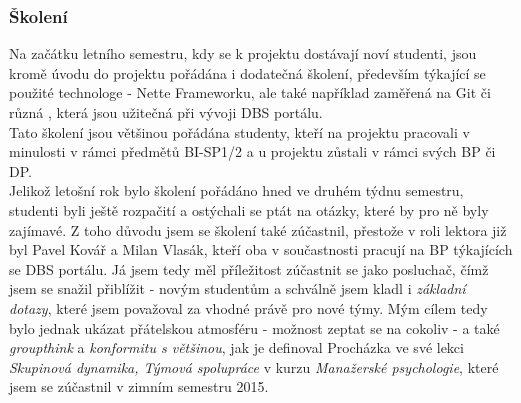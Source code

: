 \subsubsection{Školení}
Na začátku letního semestru, kdy se k projektu dostávají noví studenti, jsou kromě úvodu do projektu pořádána i dodatečná školení, především týkající se použité technologe - Nette Frameworku, ale také například zaměřená na Git či různá , která jsou užitečná při vývoji DBS portálu.\\
Tato školení jsou většinou pořádána studenty, kteří na projektu pracovali v minulosti v rámci předmětů BI-SP1/2 a u projektu zůstali v rámci svých BP či DP.\\
Jelikož letošní rok bylo školení pořádáno hned ve druhém týdnu semestru, studenti byli ještě rozpačití a ostýchali se ptát na otázky, které by pro ně byly zajímavé. Z toho důvodu jsem se školení také zúčastnil, přestože v roli lektora již byl Pavel Kovář a Milan Vlasák, kteří oba v součastnosti pracují na BP týkajících se DBS portálu. Já jsem tedy měl příležitost zúčastnit se jako posluchač, čímž jsem se snažil přiblížit  - novým studentům a schválně jsem kladl i \emph{základní dotazy}, které jsem považoval za vhodné právě pro nové týmy. Mým cílem tedy bylo jednak ukázat přátelskou atmosféru - možnost zeptat se na cokoliv - a také  \emph{groupthink} a \emph{konformitu s většinou}, jak je definoval Procházka \cite{prochazka} ve své lekci \emph{Skupinová dynamika, Týmová spolupráce} v kurzu \emph{Manažerské psychologie}, které jsem se zúčastnil v zimním semestru 2015.

